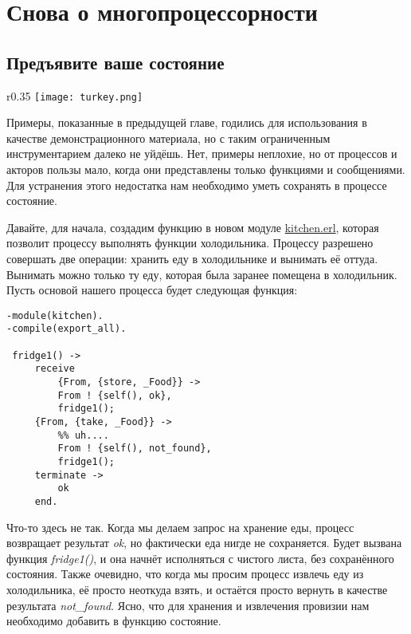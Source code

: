 \chapter{Снова о многопроцессорности}
\label{more-on-multiprocessing}
\section{Предъявите ваше состояние}
\label{state-your-state}
\begin{wrapfigure}{r}{0.35\linewidth}
    \texttt{[image: turkey.png]}
\end{wrapfigure}
Примеры, показанные в предыдущей главе, годились для использования в качестве демонстрационного материала, но с таким ограниченным инструментарием далеко не уйдёшь.
Нет, примеры неплохие, но от процессов и акторов пользы мало, когда они представлены только функциями и сообщениями.
Для устранения этого недостатка нам необходимо уметь сохранять в процессе состояние.

Давайте, для начала, создадим функцию в новом модуле \href{http://learnyousomeerlang.com/static/erlang/kitchen.erl}{kitchen.erl}, которая позволит процессу выполнять функции холодильника.
Процессу разрешено совершать две операции: хранить еду в холодильнике и вынимать её оттуда.
Вынимать можно только ту еду, которая была заранее помещена в холодильник.
Пусть основой нашего процесса будет следующая функция:
\begin{lstlisting}[style=erlang]
-module(kitchen).
-compile(export_all).
 
 fridge1() ->
     receive
         {From, {store, _Food}} ->
         From ! {self(), ok},
         fridge1();
     {From, {take, _Food}} ->
         %% uh....
         From ! {self(), not_found},
         fridge1();
     terminate ->
         ok
     end.
\end{lstlisting}

Что\--то здесь не так.
Когда мы делаем запрос на хранение еды, процесс возвращает результат \emph{ok}, но фактически еда нигде не сохраняется.
Будет вызвана функция \emph{fridge1()}, и она начнёт исполняться с чистого листа, без сохранённого состояния.
Также очевидно, что когда мы просим процесс извлечь еду из холодильника, её просто неоткуда взять, и остаётся просто вернуть в качестве результата \emph{not\_found}.
Ясно, что для хранения и извлечения провизии нам необходимо добавить в функцию состояние.

